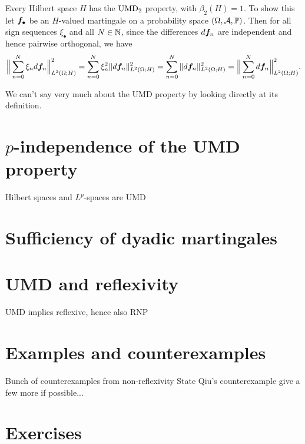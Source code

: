 \begin{example}
  Every Hilbert space $H$ has the $\mathrm{UMD}_{2}$ property, with $\beta_{2}(H) = 1$.
  To show this let $\bm{f}_{\bullet}$ be an $H$-valued martingale on a probability space $(\Omega,\mathcal{A},\mathbb{P})$.
  Then for all sign sequences $\xi_{\bullet}$ and all $N \in \mathbb{N}$, since the differences $d\bm{f}_{n}$ are independent and hence pairwise orthogonal, we have
  \begin{equation*}
      \Big\| \sum_{n=0}^N \xi_{n} d\bm{f}_{n} \Big\|_{L^2(\Omega;H)}^{2}
      = \sum_{n = 0}^{N} \xi_{n}^{2} \|d\bm{f}_{n}\|_{L^2(\Omega;H)}^{2}
      = \sum_{n = 0}^{N} \|d\bm{f}_{n}\|_{L^2(\Omega;H)}^{2}
      = \Big\| \sum_{n=0}^N d\bm{f}_{n} \Big\|_{L^2(\Omega;H)}^{2}.
  \end{equation*}
\end{example}

We can't say very much about the UMD property by looking directly at its definition.

\section{$p$-independence of the UMD property}\label{sec:UMD-p-independence}

\begin{cor}
  Hilbert spaces and $L^p$-spaces are UMD
\end{cor}

\section{Sufficiency of dyadic martingales}

\section{UMD and reflexivity}

UMD implies reflexive, hence also RNP

\section{Examples and counterexamples}

Bunch of counterexamples from non-reflexivity
State Qiu's counterexample
give a few more if possible...

\section*{Exercises}

